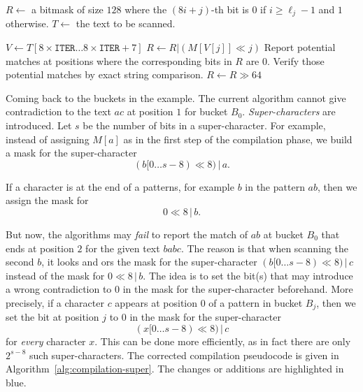 \begin{algorithm}[H]
  \caption{Execution phase of the FDR string matcher}
  \label{alg:execution}
  \begin{algorithmic}[1]
    \State $R\gets$ a bitmask of size $128$ where the $(8i+j)$-th bit is $0$ if $i\ge \ell_j-1$ and $1$ otherwise.
    \State $T\gets$ the text to be scanned.

    \State $V\gets T[8\times\texttt{ITER}\ldots 8\times\texttt{ITER}+7]$
    \State $R\gets R | (M[V[j]] \ll j)$
    \EndFor
    \State Report potential matches at positions where the corresponding bits in $R$ are $0$. Verify those potential matches by exact string comparison.
    \State $R\gets R \gg 64$
    \EndFor
  \end{algorithmic}
\end{algorithm}

Coming back to the buckets in the example. The current algorithm cannot give contradiction to the text $ac$ at position $1$ for bucket $B_0$. \textit{Super-characters} are introduced. Let $s$ be the number of bits in a super-character. For example, instead of assigning $M[a]$ as in the first step of the compilation phase, we build a mask for the super-character
$$(b[0\ldots s-8)\ll 8) \,|\, a.$$

If a character is at the end of a patterns, for example $b$ in the pattern $ab$, then we assign the mask for
$$0\ll 8 \,|\, b.$$

But now, the algorithms may \textit{fail} to report the match of $ab$ at bucket $B_0$ that ends at position $2$ for the given text $babc$. The reason is that when scanning the second $b$, it looks and ors the mask for the super-character $(b[0\ldots s-8)\ll 8) \,|\, c$ instead of the mask for $0\ll 8 \,|\, b$. The idea is to set the bit(s) that may introduce a wrong contradiction to $0$ in the mask for the super-character beforehand. More precisely, if a character $c$ appears at position $0$ of a pattern in bucket $B_j$, then we set the bit at position $j$ to $0$ in the mask for the super-character
$$(x[0\ldots s-8)\ll 8) \,|\, c$$
for \textit{every} character $x$. This can be done more efficiently, as in fact there are only $2^{s-8}$ such super-characters. The corrected compilation pseudocode is given in Algorithm~\ref{alg:compilation-super}. The changes or additions are highlighted in \textcolor{gustave}{blue}.

